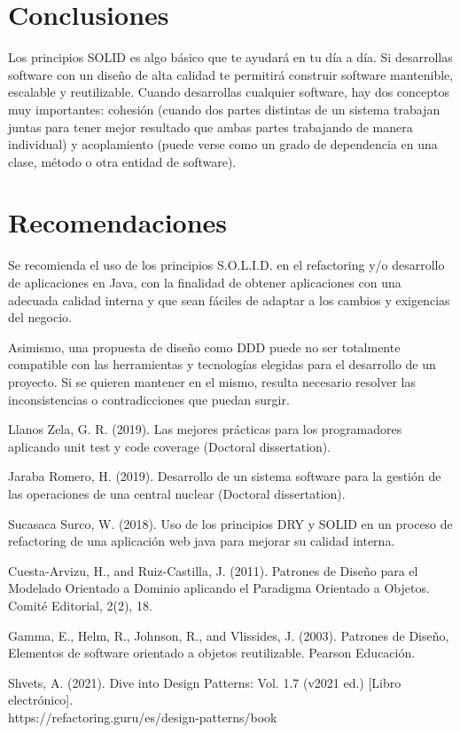 \documentclass{article}
\begin{document}
\begin{multicols}{2}
\section{Conclusiones}
 Los principios SOLID es algo básico que te ayudará en tu día a día. Si desarrollas software con un diseño de alta calidad te permitirá construir software mantenible, escalable y reutilizable. Cuando desarrollas cualquier software, hay dos conceptos muy importantes: cohesión (cuando dos partes distintas de un sistema trabajan juntas para tener mejor resultado que ambas partes trabajando de manera individual) y acoplamiento (puede verse como un grado de dependencia en una clase, método o otra entidad de software).

\section{Recomendaciones}
Se recomienda el uso de los principios S.O.L.I.D. en el refactoring y/o
desarrollo de aplicaciones en Java, con la finalidad de obtener aplicaciones con una adecuada calidad interna y que sean fáciles de adaptar a los cambios y exigencias del negocio.

Asimismo, una propuesta de diseño como DDD puede no ser totalmente compatible con las herramientas y tecnologías elegidas para el desarrollo de un proyecto. Si se quieren mantener en el mismo, resulta necesario resolver las inconsistencias o contradicciones que puedan surgir.
\end{multicols}

\begin{thebibliography}{XXX0000}
     Llanos Zela, G. R. (2019). Las mejores prácticas para los programadores aplicando unit test y code coverage (Doctoral dissertation).

     Jaraba Romero, H. (2019). Desarrollo de un sistema software para la gestión de las operaciones de una central nuclear (Doctoral dissertation).

     Sucasaca Surco, W. (2018). Uso de los principios DRY y SOLID en un proceso de refactoring de una aplicación web java para mejorar su calidad interna.

     Cuesta-Arvizu, H., and Ruiz-Castilla, J. (2011). Patrones de Diseño para el Modelado Orientado a Dominio aplicando el Paradigma Orientado a Objetos. Comité Editorial, 2(2), 18.

     Gamma, E., Helm, R., Johnson, R., and Vlissides, J. (2003). Patrones de Diseño, Elementos de software orientado a objetos reutilizable. Pearson Educación.
    
     Shvets, A. (2021). Dive into Design Patterns: Vol. 1.7 (v2021 ed.) [Libro electrónico]. \\https://refactoring.guru/es/design-patterns/book
\end{thebibliography}
\end{document}
